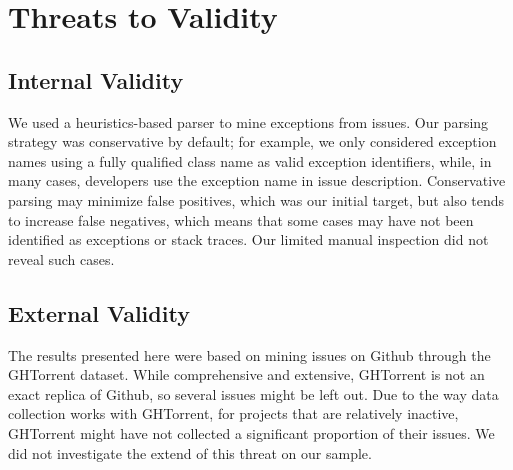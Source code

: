 \documentclass[conference]{IEEEtran}
\begin{document}
\section{Threats to Validity}






\subsection{Internal Validity}
We used a heuristics-based parser to mine exceptions from issues.  
Our parsing strategy was conservative by default; for example, we only
considered exception names using a fully qualified class name as valid
exception identifiers, while, in many cases, developers use the exception
name in issue description. Conservative parsing may minimize false positives,
which was our initial target, but also tends to increase false negatives,
which means that some cases may have not been identified as exceptions or
stack traces. Our limited manual inspection did not reveal such cases.

\subsection{External Validity}
The results presented here were based on mining issues on Github through the GHTorrent
dataset. While comprehensive and extensive, GHTorrent is not an exact replica of
Github, so several issues might be left out. Due to the way data collection works with
GHTorrent, for projects that are relatively inactive, GHTorrent might have not collected a 
significant proportion of their issues. We did not investigate the extend of this threat on 
our sample. 
\end{document}
